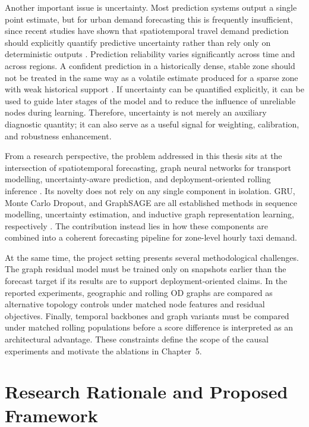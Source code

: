 \documentclass[12pt,a4paper]{report}
\begin{document}
Another important issue is uncertainty. Most prediction systems output a single point estimate, but for urban demand forecasting this is frequently insufficient, since recent studies have shown that spatiotemporal travel demand prediction should explicitly quantify predictive uncertainty rather than rely only on deterministic outputs \cite{zhuang2022sparse,wang2024probgnn}. Prediction reliability varies significantly across time and across regions. A confident prediction in a historically dense, stable zone should not be treated in the same way as a volatile estimate produced for a sparse zone with weak historical support \cite{zhuang2022sparse}. If uncertainty can be quantified explicitly, it can be used to guide later stages of the model and to reduce the influence of unreliable nodes during learning. Therefore, uncertainty is not merely an auxiliary diagnostic quantity; it can also serve as a useful signal for weighting, calibration, and robustness enhancement.

From a research perspective, the problem addressed in this thesis sits at the intersection of spatiotemporal forecasting, graph neural networks for transport modelling, uncertainty-aware prediction, and deployment-oriented rolling inference \cite{jiang2022survey}. Its novelty does not rely on any single component in isolation. GRU, Monte Carlo Dropout, and GraphSAGE are all established methods in sequence modelling, uncertainty estimation, and inductive graph representation learning, respectively \cite{cho2014gru,gal2016dropout,hamilton2017graphsage}. The contribution instead lies in how these components are combined into a coherent forecasting pipeline for zone-level hourly taxi demand.

At the same time, the project setting presents several methodological challenges. The graph residual model must be trained only on snapshots earlier than the forecast target if its results are to support deployment-oriented claims. In the reported experiments, geographic and rolling OD graphs are compared as alternative topology controls under matched node features and residual objectives. Finally, temporal backbones and graph variants must be compared under matched rolling populations before a score difference is interpreted as an architectural advantage. These constraints define the scope of the causal experiments and motivate the ablations in Chapter~5.

\section{Research Rationale and Proposed Framework}
\end{document}
